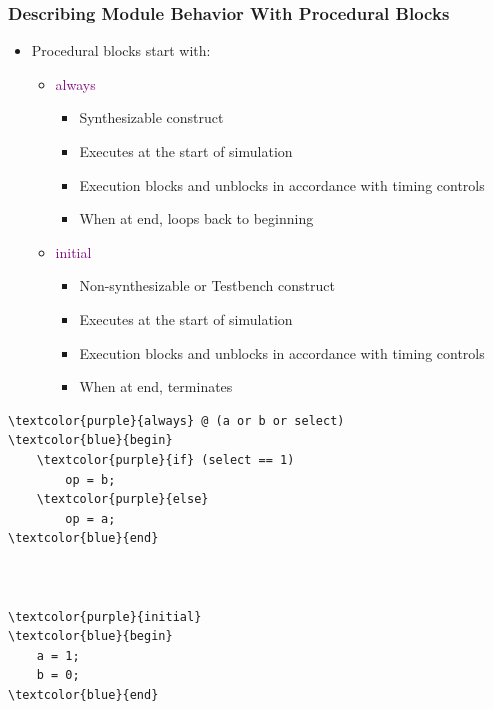 \documentclass[t, notes]{beamer}
\begin{document}
\begin{frame}[fragile]
\frametitle{Describing Module Behavior With Procedural Blocks}

\begin{multicols}{2}
\begin{itemize}
\item Procedural blocks start with:
\begin{itemize}
	\item \textcolor{purple}{always}
	\begin{itemize}
		\item Synthesizable construct
		\item Executes at the start of simulation
		\item Execution blocks and unblocks in accordance with timing controls
		\item When at end, loops back to beginning
	\end{itemize}
\end{itemize}
\begin{itemize}
	\item \textcolor{purple}{initial}
	\begin{itemize}
		\item Non-synthesizable  or Testbench construct
		\item Executes at the start of simulation
		\item Execution blocks and unblocks in accordance with timing controls
		\item When at end, terminates
	\end{itemize}
\end{itemize}
\end{itemize}

\columnbreak
{\footnotesize%
\begin{Verbatim}[commandchars=\\\{\}, tabsize=2]
\textcolor{purple}{always} @ (a or b or select)
\textcolor{blue}{begin}
	\textcolor{purple}{if} (select == 1)
		op = b;
	\textcolor{purple}{else}
		op = a;
\textcolor{blue}{end}



\textcolor{purple}{initial}
\textcolor{blue}{begin}
	a = 1;
	b = 0;
\textcolor{blue}{end}
\end{Verbatim}
}
\end{multicols}
\end{frame}
\end{document}
